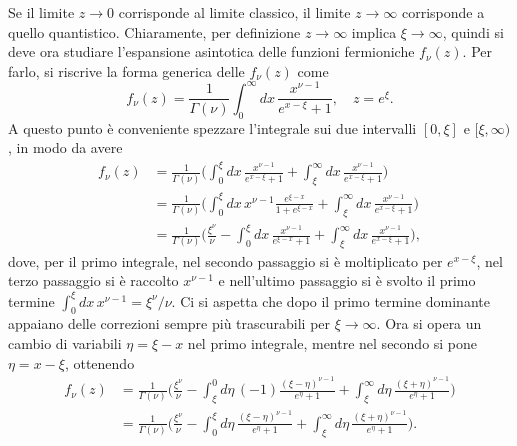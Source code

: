 \begin{caso}
    Se il limite $z \to 0$ corrisponde al limite classico, il limite $z \to \infty$ corrisponde a quello quantistico. Chiaramente, per definizione $z \to \infty$ implica $\xi \to \infty$, quindi si deve ora studiare l'espansione asintotica delle funzioni fermioniche $f_\nu(z)$. Per farlo, si riscrive la forma generica delle $f_\nu(z)$ come
    \begin{equation}
        f_\nu(z) = \frac{1}{\Gamma(\nu)}\int_0^\infty dx\,\frac{x^{\nu - 1}}{e^{x - \xi} + 1},\quad z = e^\xi.
    \end{equation}
    A questo punto è conveniente spezzare l'integrale sui due intervalli $[0,\xi]$ e $[\xi,\infty)$, in modo da avere
    \begin{equation}
        \begin{split}
            f_\nu(z) &= \frac{1}{\Gamma(\nu)} \bigg( \int_{0}^{\xi}dx\, \frac{x^{\nu-1}}{e^{x-\xi}+1} + \int_{\xi}^{\infty}dx\, \frac{x^{\nu-1}}{e^{x-\xi}+1} \bigg) \\
            &= \frac{1}{\Gamma(\nu)} \bigg( \int_{0}^{\xi}dx\,x^{\nu-1}\frac{e^{\xi-x}}{1+e^{\xi-x}} + \int_{\xi}^{\infty}dx\, \frac{x^{\nu-1}}{e^{x-\xi}+1} \bigg) \\ 
            &= \frac{1}{\Gamma(\nu)} \bigg( \frac{\xi^{\nu}}{\nu} - \int_{0}^{\xi}dx\,  \frac{x^{\nu-1}}{e^{\xi-x}+1} + \int_{\xi}^{\infty}dx\,  \frac{x^{\nu-1}}{e^{x-\xi}+1}\bigg),
        \end{split}
    \end{equation}
    dove, per il primo integrale, nel secondo passaggio si è moltiplicato per $e^{x-\xi}$, nel terzo passaggio si è raccolto $x^{\nu-1}$ e nell'ultimo passaggio si è svolto il primo termine $\int_0^\xi dx\,x^{\nu - 1} = \xi^\nu/\nu$. Ci si aspetta che dopo il primo termine dominante appaiano delle correzioni sempre più trascurabili per $\xi \to \infty$. Ora si opera un cambio di variabili $\eta = \xi - x$ nel primo integrale, mentre nel secondo si pone $\eta = x - \xi$, ottenendo
    \begin{equation}
        \begin{split}
            f_\nu(z) &= \frac{1}{\Gamma(\nu)} \bigg( \frac{\xi^{\nu}}{\nu} - \int_{\xi}^{0}d\eta\,  (-1)\frac{(\xi - \eta)^{\nu-1}}{e^\eta+1} + \int_{\xi}^{\infty}d\eta\,  \frac{(\xi + \eta)^{\nu-1}}{e^{\eta}+1}\bigg) \\
            &= \frac{1}{\Gamma(\nu)} \bigg( \frac{\xi^{\nu}}{\nu} - \int_{0}^{\xi}d\eta\, \frac{(\xi - \eta)^{\nu-1}}{e^\eta+1} + \int_{\xi}^{\infty}d\eta\,  \frac{(\xi + \eta)^{\nu-1}}{e^{\eta}+1}\bigg).

\end{split}
\end{equation}
\end{caso}
